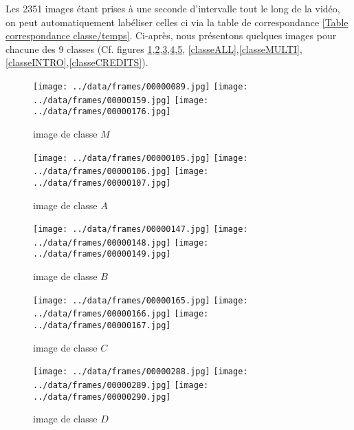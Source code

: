 \documentclass{book}
\begin{document}
Les 2351 images étant prises à une seconde d'intervalle tout le long de la vidéo, on peut automatiquement labéliser celles ci via la table de
correspondance \ref{Table correspondance classe/temps}.
Ci-après, nous présentons quelques images pour chacune des 9 classes (Cf. figures \ref{classeM},\ref{classeA},\ref{classeB},\ref{classeC},\ref{classeD},
\ref{classeALL},\ref{classeMULTI},\ref{classeINTRO},\ref{classeCREDITS}).
\begin{figure}[H]
\begin{center}
\texttt{[image: ../data/frames/00000089.jpg]}
\texttt{[image: ../data/frames/00000159.jpg]}
\texttt{[image: ../data/frames/00000176.jpg]}
\end{center}
\caption{image de classe $M$}
\label{classeM}
\end{figure}

\begin{figure}[H]
\begin{center}
\texttt{[image: ../data/frames/00000105.jpg]}
\texttt{[image: ../data/frames/00000106.jpg]}
\texttt{[image: ../data/frames/00000107.jpg]}
\end{center}
\caption{image de classe $A$}
\label{classeA}
\end{figure}

\begin{figure}[H]
\begin{center}
\texttt{[image: ../data/frames/00000147.jpg]}
\texttt{[image: ../data/frames/00000148.jpg]}
\texttt{[image: ../data/frames/00000149.jpg]}
\end{center}
\caption{image de classe $B$}
\label{classeB}
\end{figure}

\begin{figure}[H]
\begin{center}
\texttt{[image: ../data/frames/00000165.jpg]}
\texttt{[image: ../data/frames/00000166.jpg]}
\texttt{[image: ../data/frames/00000167.jpg]}
\end{center}
\caption{image de classe $C$}
\label{classeC}
\end{figure}

\begin{figure}[H]
\begin{center}
\texttt{[image: ../data/frames/00000288.jpg]}
\texttt{[image: ../data/frames/00000289.jpg]}
\texttt{[image: ../data/frames/00000290.jpg]}
\end{center}
\caption{image de classe $D$}
\label{classeD}
\end{figure}
\end{document}
